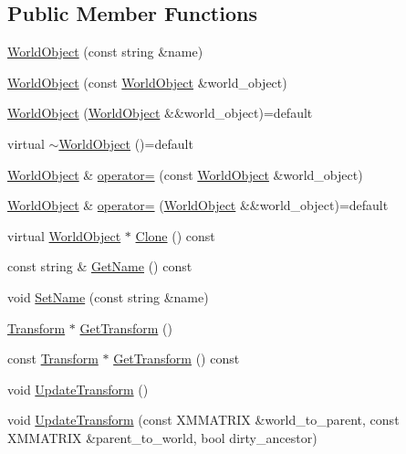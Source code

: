 \subsection*{Public Member Functions}
\begin{DoxyCompactItemize}
\item 
\hyperlink{classmage_1_1_world_object_a40d714ae9da1e197171c55f8fd321cc4}{World\+Object} (const string \&name)
\item 
\hyperlink{classmage_1_1_world_object_a4e7ace41518b45c75d975c766de28143}{World\+Object} (const \hyperlink{classmage_1_1_world_object}{World\+Object} \&world\+\_\+object)
\item 
\hyperlink{classmage_1_1_world_object_af8e2a82bd8a59d1ec8776e27ed5900cd}{World\+Object} (\hyperlink{classmage_1_1_world_object}{World\+Object} \&\&world\+\_\+object)=default
\item 
virtual \hyperlink{classmage_1_1_world_object_a6ae28ad98832c1e97b681816755a79f2}{$\sim$\+World\+Object} ()=default
\item 
\hyperlink{classmage_1_1_world_object}{World\+Object} \& \hyperlink{classmage_1_1_world_object_a0676dc2fde5791becae9547077c7db0c}{operator=} (const \hyperlink{classmage_1_1_world_object}{World\+Object} \&world\+\_\+object)
\item 
\hyperlink{classmage_1_1_world_object}{World\+Object} \& \hyperlink{classmage_1_1_world_object_a8dbb67991f149a2d4edbcd17ae4ec3ef}{operator=} (\hyperlink{classmage_1_1_world_object}{World\+Object} \&\&world\+\_\+object)=default
\item 
virtual \hyperlink{classmage_1_1_world_object}{World\+Object} $\ast$ \hyperlink{classmage_1_1_world_object_a8793d22cb63b1bd31b1307e5e7094f61}{Clone} () const
\item 
const string \& \hyperlink{classmage_1_1_world_object_a3aab270d50a8d9ab1f9a970d3e04245f}{Get\+Name} () const
\item 
void \hyperlink{classmage_1_1_world_object_aee42f65080a69ed5cfc681382328fe31}{Set\+Name} (const string \&name)
\item 
\hyperlink{structmage_1_1_transform}{Transform} $\ast$ \hyperlink{classmage_1_1_world_object_a4add48c19a884f5feaddc202c8266e9d}{Get\+Transform} ()
\item 
const \hyperlink{structmage_1_1_transform}{Transform} $\ast$ \hyperlink{classmage_1_1_world_object_a15517a1962c5eb33de5fd3da4b4afe12}{Get\+Transform} () const
\item 
void \hyperlink{classmage_1_1_world_object_a5ab5e580caa80d93a3c8b44d18ee2848}{Update\+Transform} ()
\item 
void \hyperlink{classmage_1_1_world_object_a1c4736646ad66488fe2e0706a784924d}{Update\+Transform} (const X\+M\+M\+A\+T\+R\+IX \&world\+\_\+to\+\_\+parent, const X\+M\+M\+A\+T\+R\+IX \&parent\+\_\+to\+\_\+world, bool dirty\+\_\+ancestor)
\end{DoxyCompactItemize}
